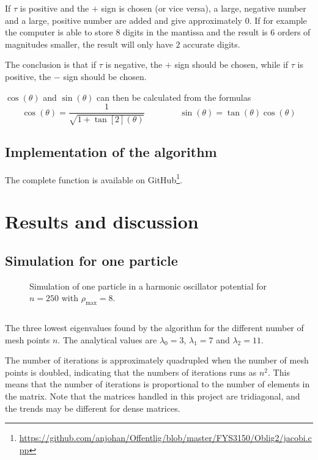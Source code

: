 \documentclass[12pt,english,a4paper]{report}
\begin{document}
If \(\tau\) is positive and the \(+\) sign is chosen (or vice versa), a large, negative number and a large, positive number are added and give approximately \(0\). If for example the computer is able to store \(8\) digits in the mantissa and the result is \(6\) orders of magnitudes smaller, the result will only have \(2\) accurate digits.

The conclusion is that if \(\tau\) is negative, the \(+\) sign should be chosen, while if \(\tau\) is positive, the \(-\) sign should be chosen.

\(\cos(\theta)\) and \(\sin(\theta)\) can then be calculated from the formulas
\[
\cos(\theta)=\frac{1}{\sqrt{1+\tan[2](\theta)}}\qquad\qquad \sin(\theta)=\tan(\theta)\cos(\theta)
\]

\clearpage
\subsection{Implementation of the algorithm}
The complete function is available on GitHub\footnote{\url{https://github.com/anjohan/Offentlig/blob/master/FYS3150/Oblig2/jacobi.cpp}}.







\section{Results and discussion}
\subsection{Simulation for one particle}
\begin{figure}[H]
\centering

\caption{Simulation of one particle in a harmonic oscillator potential for \(n=250\) with \(\rho_{\max}=8\).}
\end{figure}

\begin{table}[H]
\[

\]
\caption{The three lowest eigenvalues found by the algorithm for the different number of mesh points \(n\). The analytical values are \(\lambda_0=3\), \(\lambda_1=7\) and \(\lambda_2=11\).}
\end{table}
The number of iterations is approximately quadrupled when the number of mesh points is doubled, indicating that the numbers of iterations runs as \(n^2\). This means that the number of iterations is proportional to the number of elements in the matrix. Note that the matrices handled in this project are tridiagonal, and the trends may be different for dense matrices.
\end{document}
